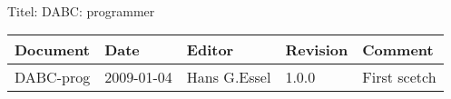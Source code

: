 \\Titel: DABC: programmer
\begin{table}[h]
\begin{tabular}{|p{2.8cm}|p{2.0cm}|p{3.0cm}|p{1.6cm}|p{5.0cm}|} \hline
Document   & Date        & Editor       & Revision & Comment \\
\hline DABC-prog & 2009-01-04 & Hans G.Essel & 1.0.0      &
First scetch \\ \hline
\end{tabular}
\end{table}
